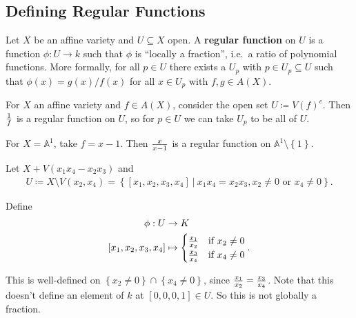 \hypertarget{defining-regular-functions}{%
\subsection{Defining Regular
Functions}\label{defining-regular-functions}}

\begin{definition}

Let \(X\) be an affine variety and \(U\subseteq X\) open. A
\textbf{regular function} on \(U\) is a function \(\phi: U\to k\) such
that \(\phi\) is ``locally a fraction'', i.e.~a ratio of polynomial
functions. More formally, for all \(p\in U\) there exists a \(U_p\) with
\(p\in U_p \subseteq U\) such that \(\phi(x) = g(x)/ f(x)\) for all
\(x\in U_p\) with \(f, g\in A(X)\).

\end{definition}

\begin{example}

For \(X\) an affine variety and \(f\in A(X)\), consider the open set
\(U\coloneqq V(f)^c\). Then \({1\over f}\) is a regular function on
\(U\), so for \(p\in U\) we can take \(U_p\) to be all of \(U\).

\end{example}

\begin{example}

For \(X = {\mathbb{A}}^1\), take \(f=x-1\). Then \({x\over x-1}\) is a
regular function on \({\mathbb{A}}^1 \setminus\left\{{1}\right\}\).

\end{example}

\begin{example}

Let \(X + V(x_1 x_4 - x_2 x_3)\) and
\begin{align*}  
U \coloneqq X\setminus V(x_2, x_4) = \left\{{{\left[ {x_1, x_2, x_3, x_4} \right]} {~\mathrel{\Big|}~}x_1 x_4 = x_2 x_3, x_2\neq 0 \text{ or } x_4\neq 0 }\right\}
.\end{align*}

Define
\begin{align*}  
\phi: U &\to K \\
{\left[ {x_1, x_2, x_3, x_4} \right]} &\mapsto
\begin{cases}
{x_1\over x_2} & \text{if } x_2 \neq 0 \\
{x_3\over x_4} & \text{if } x_4 \neq 0
\end{cases}
.\end{align*}

This is well-defined on
\(\left\{{x_2\neq 0}\right\} \cap\left\{{x_4 \neq 0}\right\}\), since
\({x_1\over x_2} = {x_3 \over x_4}\). Note that this doesn't define an
element of \(k\) at \({\left[ {0,0,0,1} \right]}\in U\). So this is not
globally a fraction.

\end{example}

